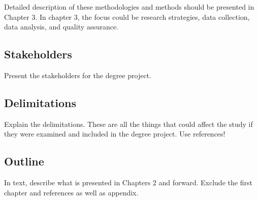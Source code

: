 Detailed description of these methodologies and methods should be presented in Chapter 3. In chapter 3, the focus could be research strategies, data collection, data analysis, and quality assurance.


\subsection{Stakeholders}
Present the stakeholders for the degree project.

\subsection{Delimitations}
Explain the delimitations. These are all the things that could affect the study if they were examined and included in the degree project. 
Use references!

\subsection{Outline}
In text, describe what is presented in Chapters 2 and forward. Exclude the first chapter and references as well as appendix. 
